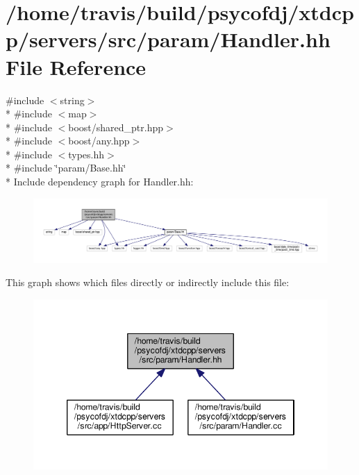 \hypertarget{Handler_8hh}{\section{/home/travis/build/psycofdj/xtdcpp/servers/src/param/\-Handler.hh File Reference}
\label{Handler_8hh}
}
{\ttfamily \#include $<$string$>$}\\*
{\ttfamily \#include $<$map$>$}\\*
{\ttfamily \#include $<$boost/shared\-\_\-ptr.\-hpp$>$}\\*
{\ttfamily \#include $<$boost/any.\-hpp$>$}\\*
{\ttfamily \#include $<$types.\-hh$>$}\\*
{\ttfamily \#include \char`\"{}param/\-Base.\-hh\char`\"{}}\\*
Include dependency graph for Handler.\-hh\-:
\nopagebreak
\begin{figure}[H]
\begin{center}
\leavevmode
\includegraphics[width=350pt]{Handler_8hh__incl}
\end{center}
\end{figure}
This graph shows which files directly or indirectly include this file\-:
\nopagebreak
\begin{figure}[H]
\begin{center}
\leavevmode
\includegraphics[width=346pt]{Handler_8hh__dep__incl}
\end{center}
\end{figure}

